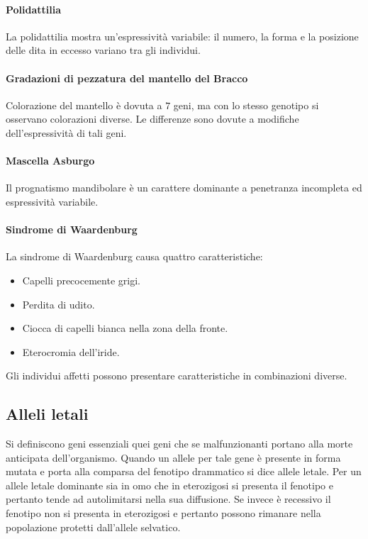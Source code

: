\paragraph{Polidattilia}
La polidattilia mostra un'espressivit\`a variabile: il numero, la forma e la posizione delle dita in eccesso variano tra gli individui.
\paragraph{Gradazioni  di pezzatura del mantello del Bracco}
Colorazione del mantello \`e dovuta a $7$ geni, ma con lo stesso genotipo si osservano colorazioni diverse. Le differenze sono dovute a modifiche dell'espressivit\`a di tali geni.
\paragraph{Mascella Asburgo}
Il prognatismo mandibolare \`e un carattere dominante a penetranza incompleta ed espressivit\`a variabile.
\paragraph{Sindrome di Waardenburg}
La sindrome di Waardenburg causa quattro caratteristiche:
\begin{multicols}{2}
	\begin{itemize}
		\item Capelli precocemente grigi.
		\item Perdita di udito.
		\item Ciocca di capelli bianca nella zona della fronte.
		\item Eterocromia dell'iride.
	\end{itemize}
\end{multicols}
Gli individui affetti possono presentare caratteristiche in combinazioni diverse.
\subsection{Alleli letali}
Si definiscono geni essenziali quei geni che se malfunzionanti portano alla morte anticipata dell'organismo. Quando un allele per tale gene \`e presente in forma mutata e porta
alla comparsa del fenotipo drammatico si dice allele letale. Per un allele letale dominante sia in omo che in eterozigosi si presenta il fenotipo e pertanto tende ad autolimitarsi nella
sua diffusione. Se invece \`e recessivo il fenotipo non si presenta in eterozigosi e pertanto possono rimanare nella popolazione protetti dall'allele selvatico. 
